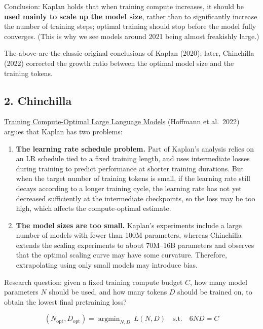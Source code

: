 \documentclass[
  english,
  11pt,
  a4paper,
]{article}
\providecommand{\tightlist}{%
  \setlength{\itemsep}{0pt}\setlength{\parskip}{0pt}}
\newenvironment{NotesFormula}{%
  \par\noindent\begin{minipage}{\linewidth}%
  \setlength{\parindent}{2em}%
  \setlength{\parskip}{0.35em}%
}{\end{minipage}\par}
\begin{document}
Conclusion: Kaplan holds that when training compute increases, it should
be \textbf{used mainly to scale up the model size}, rather than to
significantly increase the number of training steps; optimal training
should stop before the model fully converges. (This is why we see models
around 2021 being almost freakishly large.)

The above are the classic original conclusions of Kaplan (2020); later,
Chinchilla (2022) corrected the growth ratio between the optimal model
size and the training tokens.

\clearpage

\subsection{2. Chinchilla}\label{chinchilla}

\href{https://arxiv.org/abs/2203.15556}{Training Compute-Optimal Large
Language Models} (Hoffmann et al.~2022) argues that Kaplan has two
problems:

\begin{enumerate}
\def\labelenumi{\arabic{enumi}.}
\tightlist
\item
  \textbf{The learning rate schedule problem.} Part of Kaplan's analysis
  relies on an LR schedule tied to a fixed training length, and uses
  intermediate losses during training to predict performance at shorter
  training durations. But when the target number of training tokens is
  small, if the learning rate still decays according to a longer
  training cycle, the learning rate has not yet decreased sufficiently
  at the intermediate checkpoints, so the loss may be too high, which
  affects the compute-optimal estimate.
\item
  \textbf{The model sizes are too small.} Kaplan's experiments include a
  large number of models with fewer than 100M parameters, whereas
  Chinchilla extends the scaling experiments to about 70M--16B
  parameters and observes that the optimal scaling curve may have some
  curvature. Therefore, extrapolating using only small models may
  introduce bias.
\end{enumerate}

\begin{NotesFormula}

Research question: given a fixed training compute budget \(C\), how many
model parameters \(N\) should be used, and how many tokens \(D\) should
be trained on, to obtain the lowest final pretraining loss?

\[\boxed{(N_{\mathrm{opt}},D_{\mathrm{opt}})=\mathop{\mathrm{argmin}}_{N,D}\,L(N,D)\quad\text{s.t.}\quad 6ND=C}\]

\end{NotesFormula}
\end{document}
